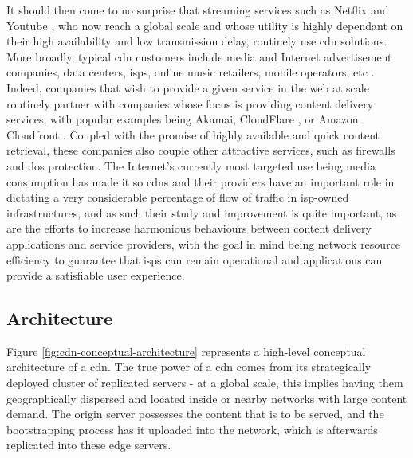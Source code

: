    It should then come to no surprise that streaming services such as Netflix \cite{netflix} and Youtube \cite{youtube}, who now reach a global scale and whose utility is highly dependant on their high availability and low transmission delay, routinely use \gls{cdn} solutions.
    More broadly, typical \gls{cdn} customers include media and Internet advertisement companies, data centers, \glspl{isp}, online music retailers, mobile operators, etc \cite{cdn-survey}.
    Indeed, companies that wish to provide a given service in the web at scale routinely partner with companies whose focus is providing content delivery services, with popular examples being Akamai, CloudFlare \cite{cloudflare}, or Amazon Cloudfront \cite{cloudfront}.
    Coupled with the promise of highly available and quick content retrieval, these companies also couple other attractive services, such as firewalls and \gls{dos} protection.
    The Internet's currently most targeted use being media consumption has made it so \glspl{cdn} and their providers have an important role in dictating a very considerable percentage of flow of traffic in \gls{isp}-owned infrastructures, and as such their study and improvement is quite important, as are the efforts to increase harmonious behaviours between content delivery applications and service providers, with the goal in mind being network resource efficiency to guarantee that \glspl{isp} can remain operational and applications can provide a satisfiable user experience.

\subsection{Architecture}

\label{ssec:cdn-architecture}

    Figure \ref{fig:cdn-conceptual-architecture} represents a high-level conceptual architecture of a \gls{cdn}.
    The true power of a \gls{cdn} comes from its strategically deployed cluster of replicated servers - at a global scale, this implies having them geographically dispersed and located inside or nearby networks with large content demand.
    The origin server possesses the content that is to be served, and the bootstrapping process has it uploaded into the network, which is afterwards replicated into these edge servers.

